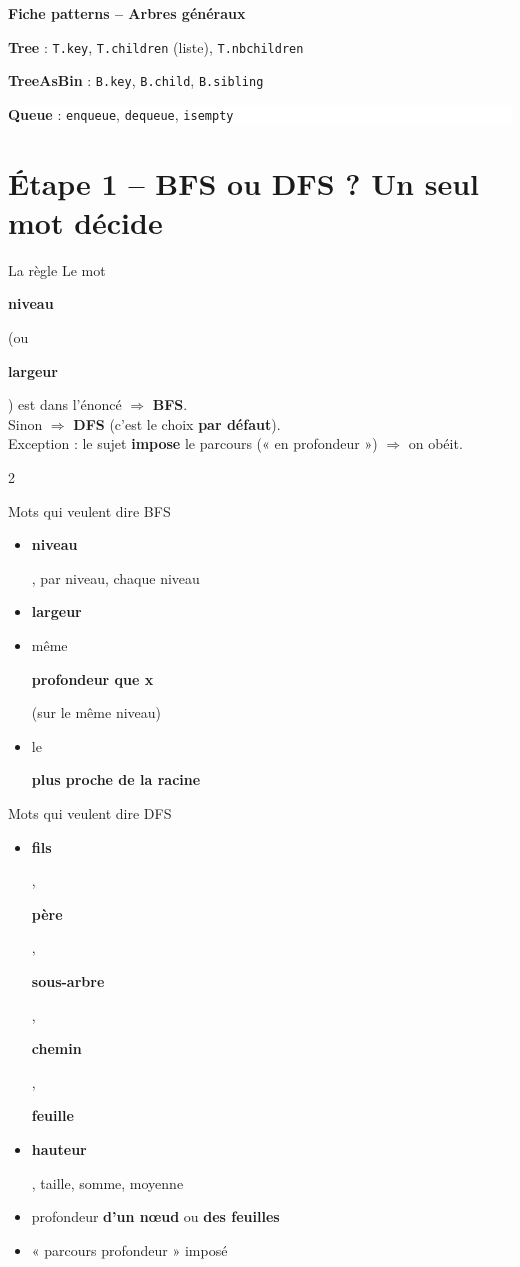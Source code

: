 \documentclass[10pt,a4paper]{article}
\newcommand{\BFS}{\textcolor{bfs}{\textbf{BFS}}}
\newcommand{\DFS}{\textcolor{dfs}{\textbf{DFS}}}
\newcommand{\mot}[1]{\colorbox{rose!55}{\strut\textbf{#1}}}
\newcommand{\sect}[1]{\section*{\color{theme}#1}}
\begin{document}
\begin{tcolorbox}[enhanced,colback=theme,colframe=theme,arc=4pt,boxrule=0pt,
  left=8pt,right=8pt,top=6pt,bottom=6pt,halign=center,borderline south={3pt}{0pt}{rose}]
{\color{white}\LARGE\bfseries Fiche patterns -- Arbres g\'en\'eraux}\\[4pt]
\colorbox{treebg}{\strut\small\color{treec}\textbf{Tree} : \texttt{T.key}, \texttt{T.children} (liste), \texttt{T.nbchildren}}
\quad
\colorbox{tabbg}{\strut\small\color{tabc}\textbf{TreeAsBin} : \texttt{B.key}, \texttt{B.child}, \texttt{B.sibling}}
\quad
\colorbox{white}{\strut\small\color{gris}\textbf{Queue} : \texttt{enqueue}, \texttt{dequeue}, \texttt{isempty}}
\end{tcolorbox}

\sect{\'Etape 1 -- BFS ou DFS ? Un seul mot d\'ecide}

\begin{regle}{La r\`egle}
\Large Le mot \mot{niveau} (ou \mot{largeur}) est dans l'\'enonc\'e \;$\Rightarrow$\; \BFS.\\[3pt]
Sinon \;$\Rightarrow$\; \DFS{} \normalsize (c'est le choix \textbf{par d\'efaut}).\\[3pt]
\normalsize Exception : le sujet \textbf{impose} le parcours (« en profondeur ») $\Rightarrow$ on ob\'eit.
\end{regle}

\begin{multicols}{2}
\begin{boxbfs}{Mots qui veulent dire BFS}
\begin{itemize}
\item \mot{niveau}, par niveau, chaque niveau
\item \mot{largeur}
\item m\^eme \mot{profondeur que x} (sur le m\^eme niveau)
\item le \mot{plus proche de la racine}
\end{itemize}
\end{boxbfs}
\columnbreak
\begin{boxdfs}{Mots qui veulent dire DFS}
\begin{itemize}
\item \mot{fils}, \mot{p\`ere}, \mot{sous-arbre}, \mot{chemin}, \mot{feuille}
\item \mot{hauteur}, taille, somme, moyenne
\item profondeur \textbf{d'un n\oe ud} ou \textbf{des feuilles}
\item « parcours profondeur » impos\'e
\end{itemize}
\end{boxdfs}
\end{multicols}
\end{document}

